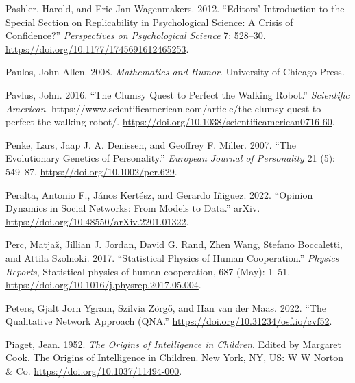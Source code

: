 \documentclass[
  a4paper,
  DIV=11,
  numbers=noendperiod,
  oneside]{scrreprt}
\newlength{\cslhangindent}
\newlength{\cslentryspacingunit} %
\newenvironment{CSLReferences}[2] %
 {%
  \setlength{\parindent}{0pt}
  \ifodd #1
  \let\oldpar\par
  \def\par{\hangindent=\cslhangindent\oldpar}
  \fi
  \setlength{\parskip}{#2\cslentryspacingunit}
 }%
 {}
\begin{document}
\begin{CSLReferences}{1}{0}
\leavevmode{}%
Pashler, Harold, and Eric-Jan Wagenmakers. 2012. {``Editors'
Introduction to the Special Section on Replicability in Psychological
Science: {A} Crisis of Confidence?''} \emph{Perspectives on
Psychological Science} 7: 528--30.
\url{https://doi.org/10.1177/1745691612465253}.

\leavevmode{}%
Paulos, John Allen. 2008. \emph{Mathematics and {Humor}}. {University of
Chicago Press}.

\leavevmode{}%
Pavlus, John. 2016. {``The {Clumsy Quest} to {Perfect} the {Walking
Robot}.''} \emph{Scientific American}.
https://www.scientificamerican.com/article/the-clumsy-quest-to-perfect-the-walking-robot/.
\url{https://doi.org/10.1038/scientificamerican0716-60}.

\leavevmode{}%
Penke, Lars, Jaap J. A. Denissen, and Geoffrey F. Miller. 2007. {``The
Evolutionary Genetics of Personality.''} \emph{European Journal of
Personality} 21 (5): 549--87. \url{https://doi.org/10.1002/per.629}.

\leavevmode{}%
Peralta, Antonio F., János Kertész, and Gerardo Iñiguez. 2022.
{``Opinion Dynamics in Social Networks: {From} Models to Data.''}
{arXiv}. \url{https://doi.org/10.48550/arXiv.2201.01322}.

\leavevmode{}%
Perc, Matjaž, Jillian J. Jordan, David G. Rand, Zhen Wang, Stefano
Boccaletti, and Attila Szolnoki. 2017. {``Statistical Physics of Human
Cooperation.''} \emph{Physics Reports}, Statistical physics of human
cooperation, 687 (May): 1--51.
\url{https://doi.org/10.1016/j.physrep.2017.05.004}.

\leavevmode{}%
Peters, Gjalt Jorn Ygram, Szilvia Zörgő, and Han van der Maas. 2022.
{``The {Qualitative Network Approach} ({QNA}.''}
\url{https://doi.org/10.31234/osf.io/cvf52}.

\leavevmode{}%
Piaget, Jean. 1952. \emph{The Origins of Intelligence in Children}.
Edited by Margaret Cook. The Origins of Intelligence in Children. {New
York, NY, US}: {W W Norton \& Co}.
\url{https://doi.org/10.1037/11494-000}.


\end{CSLReferences}
\end{document}
